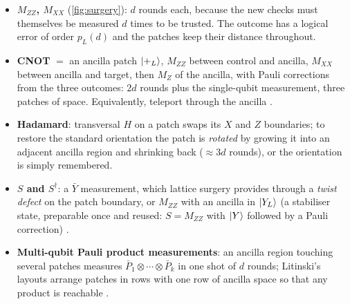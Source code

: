 \begin{itemize}[leftmargin=*]
\item \textbf{$M_{ZZ}$, $M_{XX}$} (\cref{fig:surgery}): $d$ rounds each, because the new checks must themselves be measured $d$ times to be trusted. The outcome has a logical error of order $p_L(d)$ and the patches keep their distance throughout.
\item \textbf{CNOT} $=$ an ancilla patch $\lvert +_L \rangle$, $M_{ZZ}$ between control and ancilla, $M_{XX}$ between ancilla and target, then $M_Z$ of the ancilla, with Pauli corrections from the three outcomes: $2d$ rounds plus the single-qubit measurement, three patches of space. Equivalently, teleport through the ancilla \cite{horsman12,fowler-gidney18}.
\item \textbf{Hadamard}: transversal $H$ on a patch swaps its $X$ and $Z$ boundaries; to restore the standard orientation the patch is \emph{rotated} by growing it into an adjacent ancilla region and shrinking back ($\approx3d$ rounds), or the orientation is simply remembered.
\item \textbf{$S$ and $S^\dagger$}: a $\bar Y$ measurement, which lattice surgery provides through a \emph{twist defect} on the patch boundary, or $M_{ZZ}$ with an ancilla in $\lvert Y_L \rangle$ (a stabiliser state, preparable once and reused: $S=M_{ZZ}$ with $\lvert Y \rangle$ followed by a Pauli correction) \cite{litinski19game}.
\item \textbf{Multi-qubit Pauli product measurements}: an ancilla region touching several patches measures $\bar P_1\otimes\cdots\otimes\bar P_k$ in one shot of $d$ rounds; Litinski's layouts arrange patches in rows with one row of ancilla space so that any product is reachable \cite{litinski19game}.
\end{itemize}

